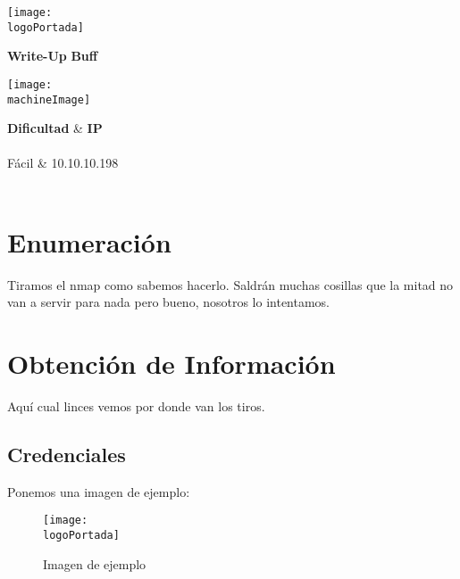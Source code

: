 \documentclass[a4paper]{article} %
\newcommand{\machineName}{Buff}					%
\newcommand{\logoPortada}{Images/portada.png}	%
\newcommand{\machineImage}{Images/maquina.png}	%
\begin{document}
	\cfoot{\thepage}
	
	\begin{titlepage}
		
		\centering
		\texttt{[image: \\logoPortada]} \\
		\vfill
		
		{\Huge\bfseries{Write-Up}} \vskip 0.2cm
		{\Huge\bfseries\textcolor{verdeHTB}{\machineName}} \\
		\vfill
		
		\texttt{[image: \\machineImage]} \vskip 1cm
		

	
		\vfill
		\begin{tcolorbox}[tab1,tabularx={Y||Y}]	
			{\Huge\bfseries{Dificultad}} & {\Huge\bfseries{IP}} \\ \\
			{\Large{Fácil}}  & {\Large{10.10.10.198}} \\
			\\
		\end{tcolorbox}

		
	\end{titlepage}
	
	
	
	
	\clearpage
	\tableofcontents	
	\clearpage
	
	
	\section{Enumeración}
	Tiramos el nmap como sabemos hacerlo. Saldrán muchas cosillas que la mitad no van a servir para nada pero bueno, nosotros lo intentamos. 
	
	\section{Obtención de Información}
	Aquí cual linces vemos por donde van los tiros. 
	
	\subsection{Credenciales}
	Ponemos una imagen de ejemplo:
	
	\begin{figure}[h]
		\centering
		\texttt{[image: \\logoPortada]}
		\caption{Imagen de ejemplo}
	\end{figure}
	
\end{document}
